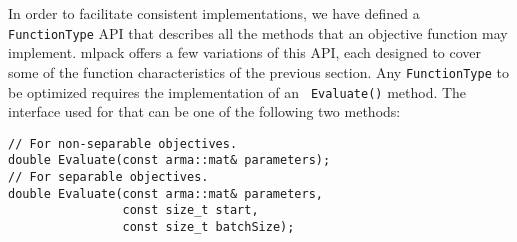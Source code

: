 \documentclass{article}
\begin{document}
In order to facilitate consistent implementations, we have defined a {\tt
FunctionType} API that describes all the methods that an objective function
may implement.  mlpack offers a few variations of this API, each designed to
cover some of the function characteristics of the previous section.
Any {\tt FunctionType} to be optimized requires the implementation of an {\tt
Evaluate()} method.  The interface used for that can be one of the following
two methods:

\vspace*{-0.3em}
\begin{verbatim}
// For non-separable objectives.
double Evaluate(const arma::mat& parameters);
// For separable objectives.
double Evaluate(const arma::mat& parameters,
                const size_t start,
                const size_t batchSize);
\end{verbatim}
\vspace*{-0.3em}
\end{document}
